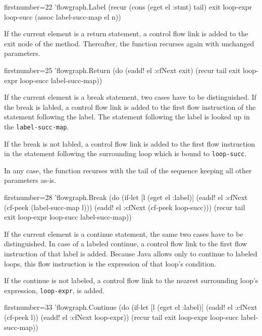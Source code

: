 \documentclass[11pt]{article}
\begin{document}
\begin{clojurecode*}{firstnumber=22}
        'flowgraph.Label
                   (recur (cons (eget el :stmt) tail) exit loop-expr loop-succ
                          (assoc label-succ-map el n))
\end{clojurecode*}

If the current element is a return statement, a control flow link is added to
the exit node of the method.  Thereafter, the function recurses again with
unchanged parameters.

\begin{clojurecode*}{firstnumber=25}
        'flowgraph.Return
                   (do (eadd! el :cfNext exit)
                       (recur tail exit loop-expr loop-succ label-succ-map))
\end{clojurecode*}

If the current element is a break statement, two cases have to be
distinguished.  If the break is labled, a control flow link is added to the
first flow instruction of the statement following the label.  The statement
following the label is looked up in the \verb|label-succ-map|.

If the break is not labled, a control flow link is added to the first flow
instruction in the statement following the surrounding loop which is bound to
\verb|loop-succ|.

In any case, the function recurses with the tail of the sequence keeping all
other parameters as-is.

\begin{clojurecode*}{firstnumber=28}
        'flowgraph.Break
                   (do (if-let [l (eget el :label)]
                         (eadd! el :cfNext (cf-peek (label-succ-map l)))
                         (eadd! el :cfNext (cf-peek loop-succ)))
                       (recur tail exit loop-expr loop-succ label-succ-map))
\end{clojurecode*}

If the current element is a continue statement, the same two cases have to be
distinguished.  In case of a labeled continue, a control flow link to the first
flow instruction of that label is added.  Because Java allows only to continue
to labeled loops, this flow instruction is the expression of that loop's
condition.

If the continue is not labeled, a control flow link to the nearest surrounding
loop's expression, \verb|loop-expr|, is added.

\begin{clojurecode*}{firstnumber=33}
        'flowgraph.Continue
                   (do (if-let [l (eget el :label)]
                         (eadd! el :cfNext (cf-peek l))
                         (eadd! el :cfNext loop-expr))
                       (recur tail exit loop-expr loop-succ label-succ-map))
\end{clojurecode*}
\end{document}

